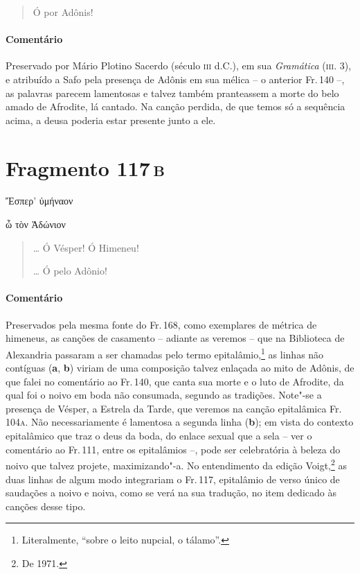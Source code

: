\begin{verse}
Ó por Adônis!
\end{verse}

\medskip

{\paragraph{Comentário} Preservado por Mário Plotino Sacerdo (século \textsc{iii} d.C.), em sua
\textit{Gramática} (\textsc{iii}. 3), e atribuído a Safo pela presença de Adônis em
sua mélica -- o anterior Fr.\,140 --, as palavras parecem lamentosas e
talvez também pranteassem a morte do belo amado de Afrodite, lá cantado. Na canção perdida, de que temos só a sequência acima, a deusa poderia estar presente junto a ele.}


\pagebreak
\section{Fragmento 117\,\textsc{b}}

\begin{gkverse}
 Ἔσπερ’ ὐμήναον

\hspace*{10mm}

ὦ τὸν Ἀδώνιον
\end{gkverse}

\begin{verse}
\ldots{} Ó Vésper! Ó Himeneu!

\hspace*{10mm}

\ldots{} Ó pelo Adônio!
\end{verse}

\medskip

{\paragraph{Comentário} Preservados pela mesma fonte do Fr.\,168, como exemplares de métrica de
himeneus, as canções de casamento -- adiante as veremos -- que na
Biblioteca de Alexandria passaram a ser chamadas pelo termo epitalâmio,\footnote{Literalmente, ``sobre o leito nupcial, o tálamo''.} as linhas não contíguas (\textbf{a}, \textbf{b}) viriam de uma composição talvez enlaçada ao mito de Adônis, de que falei no
comentário ao Fr.\,140, que canta sua morte e o luto de Afrodite, da qual foi o noivo em boda não consumada, segundo as tradições. Note"-se
a presença de Vésper, a Estrela da Tarde, que veremos na canção
epitalâmica Fr.\,104\textsc{a}. Não necessariamente é lamentosa a segunda linha
(\textbf{b}); em vista do contexto epitalâmico que traz o deus da boda, do
enlace sexual que a sela -- ver o comentário ao Fr.\,111, entre os
epitalâmios --, pode ser celebratória à beleza do noivo que talvez projete, maximizando"-a. No entendimento da edição Voigt,\footnote{De 1971.} as duas linhas de algum modo integrariam o Fr.\,117, epitalâmio de verso único de saudações a noivo e noiva, como se verá na sua tradução, no item dedicado às canções desse tipo.}




